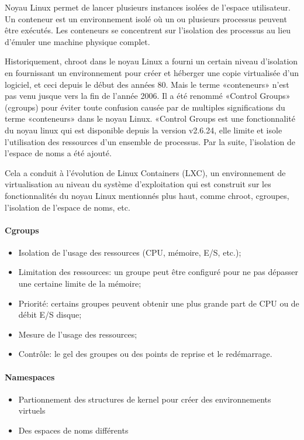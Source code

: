 \begin{onehalfspace}
Noyau Linux permet de lancer plusieurs instances isolées de l'espace utilisateur. Un conteneur est un environnement isolé où un ou plusieurs processus peuvent être exécutés. Les conteneurs se concentrent sur l'isolation des processus au lieu d'émuler une machine physique complet.

Historiquement, chroot dans le noyau Linux a fourni un certain niveau d'isolation en fournissant un environnement pour créer et héberger une copie virtualisée d'un logiciel, et ceci depuis le début des années 80. Mais le terme «conteneurs» n'est pas venu jusque vers la fin de l'année 2006. Il a été renommé «Control Groups» (cgroups) pour éviter toute confusion causée par de multiples significations du terme «conteneurs» dans le noyau Linux. «Control Groups est une fonctionnalité du noyau linux qui est disponible depuis la version v2.6.24, elle limite et isole l'utilisation des ressources d'un ensemble de processus. Par la suite, l'isolation de l'espace de noms a été ajouté.

Cela a conduit à l'évolution de Linux Containers (LXC), un environnement de virtualisation au niveau du système d'exploitation qui est construit sur les fonctionnalités du noyau Linux mentionnés plus haut, comme chroot, cgroupes, l'isolation de l'espace de noms, etc.

\paragraph{Cgroups}

\begin{itemize}
\item Isolation de l'usage des ressources (CPU, mémoire, E/S, etc.);
\item Limitation des ressources: un groupe peut être configuré pour ne pas dépasser une certaine limite de la mémoire;
\item Priorité: certains groupes peuvent obtenir une plus grande part de CPU ou de débit E/S disque;
\item Mesure de l'usage des ressources;
\item Contrôle: le gel des groupes ou des points de reprise et le redémarrage.
\end{itemize}

\paragraph{Namespaces}
\begin{itemize}
\item Partionnement des structures de kernel pour créer des environnements virtuels
\item Des espaces de noms différents


\end{itemize}
\end{onehalfspace}

